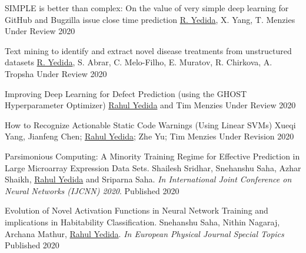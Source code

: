 


\begin{cvhonors}

    \cvhonor
        {SIMPLE is better than complex: On the value of very simple deep learning for GitHub and Bugzilla issue close time prediction}
        {\underline{R. Yedida},  X. Yang,  T. Menzies}
        {Under Review}
        {2020}

    \cvhonor
        {Text mining to identify and extract novel disease treatments from unstructured datasets}
        {\underline{R. Yedida}, S. Abrar, C. Melo-Filho, E. Muratov, R. Chirkova, A. Tropsha}
        {Under Review}
        {2020}

    \cvhonor
        {Improving Deep Learning for Defect Prediction (using the GHOST Hyperparameter Optimizer)}
        {\underline{Rahul Yedida} and Tim Menzies}
        {Under Review}
        {2020}

    \cvhonor
        {How to Recognize Actionable Static Code Warnings (Using Linear SVMs)}
        {Xueqi Yang, Jianfeng Chen; \underline{Rahul Yedida}; Zhe Yu; Tim Menzies}
        {Under Revision}
        {2020}

    \cvhonor
        {Parsimonious Computing: A Minority Training Regime for Effective Prediction in Large Microarray Expression Data Sets.}
        {Shailesh Sridhar, Snehanshu Saha, Azhar Shaikh, \underline{Rahul Yedida} and Sriparna Saha.  \textit{In International Joint Conference on Neural Networks (IJCNN) 2020}.}
        {Published}
        {2020}

    \cvhonor
        {Evolution of Novel Activation Functions in Neural Network Training and implications in Habitability Classification.}
        {Snehanshu Saha, Nithin Nagaraj, Archana Mathur, \underline{Rahul Yedida}. \textit{In European Physical Journal Special Topics}}
        {Published}
        {2020}


\end{cvhonors}
